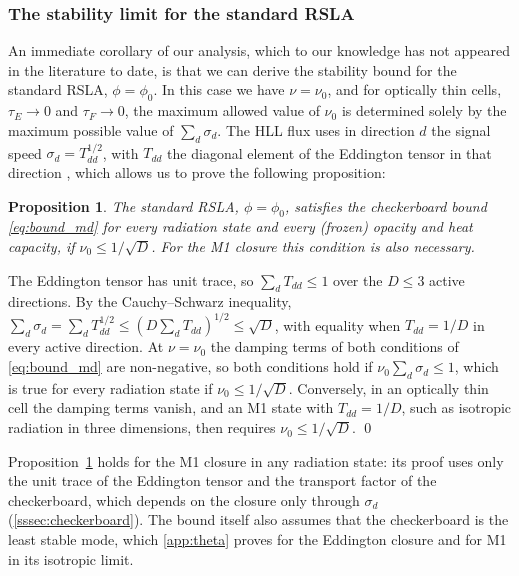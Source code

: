 \documentclass[preprint,12pt,authoryear]{elsarticle}
\newtheorem{prop}{Proposition}
\begin{document}
\subsubsection{The stability limit for the standard RSLA}
\label{sssec:phi0}

An immediate corollary of our analysis, which to our knowledge has not appeared in the literature to date, is that we can derive the stability bound for the standard RSLA, $\phi = \phi_0$. In this case we have $\nu = \nu_0$, and for optically thin cells, $\tau_E \to 0$ and $\tau_F \to 0$, the maximum allowed value of $\nu_0$ is determined solely by the maximum possible value of $\sum_d \sigma_d$. The HLL flux uses in direction $d$ the signal speed $\sigma_d = T_{dd}^{1/2}$, with $T_{dd}$ the diagonal element of the Eddington tensor in that direction \citep{Balsara_1999}, which allows us to prove the following proposition:


\begin{prop}
\label{prop:rsla}
The standard RSLA, $\phi = \phi_0$, satisfies the checkerboard bound \autoref{eq:bound_md} for every radiation state and every (frozen) opacity and heat capacity, if $\nu_0 \leq 1/\sqrt{D}$. For the M1 closure this condition is also necessary.
\end{prop}

\begin{pf}
The Eddington tensor has unit trace, so $\sum_d T_{dd} \leq 1$ over the $D \leq 3$ active directions. By the Cauchy--Schwarz inequality, $\sum_d\sigma_d = \sum_d T_{dd}^{1/2} \leq (D\sum_d T_{dd})^{1/2} \leq \sqrt{D}$, with equality when $T_{dd} = 1/D$ in every active direction. At $\nu = \nu_0$ the damping terms of both conditions of \autoref{eq:bound_md} are non-negative, so both conditions hold if $\nu_0\sum_d\sigma_d \leq 1$, which is true for every radiation state if $\nu_0 \leq 1/\sqrt{D}$. Conversely, in an optically thin cell the damping terms vanish, and an M1 state with $T_{dd} = 1/D$, such as isotropic radiation in three dimensions, then requires $\nu_0 \leq 1/\sqrt{D}$. \qed
\end{pf}

Proposition~\ref{prop:rsla} holds for the M1 closure in any radiation state: its proof uses only the unit trace of the Eddington tensor and the transport factor of the checkerboard, which depends on the closure only through $\sigma_d$ (\autoref{sssec:checkerboard}). The bound itself also assumes that the checkerboard is the least stable mode, which \ref{app:theta} proves for the Eddington closure and for M1 in its isotropic limit.
\end{document}
